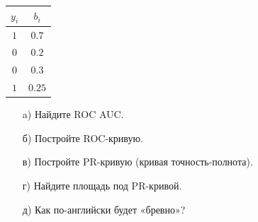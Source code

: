 \documentclass[12pt, a4paper, oneside]{article}
\begin{document}
\begin{center}
	\begin{tabular}{c|c}
		$y_i$ & $b_i$ \\
		\hline
		$1$  & $0.7$ \\
		$0$ & $0.2$ \\
		$0$ & $0.3$ \\
		$1$ & $0.25$ \\
	\end{tabular}
\end{center}

\begin{enumerate}
	\item[a)] Найдите ROC AUC.
	\item[б)] Постройте ROC-кривую.
	\item[в)] Постройте PR-кривую (кривая точность-полнота).
	\item[г)] Найдите площадь под PR-кривой.
	\item[д)] Как по-английски будет «бревно»?
\end{enumerate}
\end{document}

